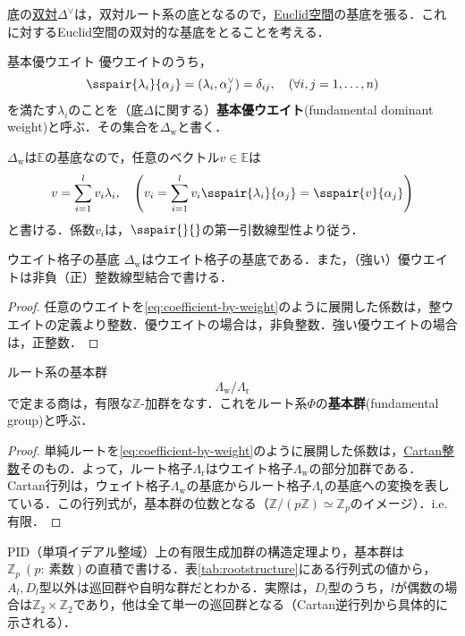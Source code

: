 \documentclass[rep_main]{subfiles}
\begin{document}
底の\hyperref[def:dual-root]{双対}$\Delta^\vee$は，双対ルート系の底となるので，\hyperref[def:Euclid-space]{Euclid空間}の基底を張る．これに対するEuclid空間の双対的な基底をとることを考える．
\begin{mydef}[label=def:fundamental-weight]{基本優ウエイト}
	優ウエイトのうち，
	\begin{equation}
		\sspair{\lambda_i}{\alpha_j} = (\lambda_i, \alpha_j^\vee) = \delta_{ij},\quad  (\forall i, j = 1, \ldots, n)
	\end{equation}
	を満たす$\lambda_i$のことを（底$\Delta$に関する）\textbf{基本優ウエイト}(fundamental dominant weight)と呼ぶ．その集合を$\Delta_\text{w}$と書く．
\end{mydef}
$\Delta_\text{w}$は$\mathbb{E}$の基底なので，任意のベクトル$v \in \mathbb{E}$は
\begin{equation}
	\label{eq:coefficient-by-weight}
	v = \sum_{i=1}^l v_i\lambda_i,\quad  \Biggl(v_i = \sum_{i=1}^l v_i\sspair{\lambda_i}{\alpha_j} = \sspair{v}{\alpha_j}\Biggr)
\end{equation}
と書ける．係数$v_i$は，$\sspair{}{}$の第一引数線型性より従う．
\begin{mytheo}[label=thm:weightlatticebasis]{ウエイト格子の基底}
	$\Delta_\text{w}$はウエイト格子の基底である．また，（強い）優ウエイトは非負（正）整数線型結合で書ける．
\end{mytheo}
\begin{proof}
	任意のウエイトを\eqref{eq:coefficient-by-weight}のように展開した係数は，整ウエイトの定義より整数．優ウエイトの場合は，非負整数．強い優ウエイトの場合は，正整数．
\end{proof}
\begin{mydef}[label=def:root-fundamental-group]{ルート系の基本群}
	\begin{equation}
		\Lambda_\text{w} / \Lambda_\text{r}
	\end{equation}
	で定まる商は，有限な$\mathbb{Z}$-加群をなす．これをルート系$\Phi$の\textbf{基本群}(fundamental group)と呼ぶ．
\end{mydef}
\begin{proof}
	単純ルートを\eqref{eq:coefficient-by-weight}のように展開した係数は，\hyperref[def:Cartan-matrix]{Cartan整数}そのもの．よって，ルート格子$\Lambda_\text{r}$はウエイト格子$\Lambda_\text{w}$の部分加群である．\\
	Cartan行列は，ウェイト格子$\Lambda_\text{w}$の基底からルート格子$\Lambda_\text{r}$の基底への変換を表している．この行列式が，基本群の位数となる（$\mathbb{Z}/(p\mathbb{Z}) \simeq \mathbb{Z}_p$のイメージ）．i.e. 有限．
\end{proof}
PID（単項イデアル整域）上の有限生成加群の構造定理より，基本群は$\mathbb{Z}_p\ (p:\ \text{素数})$の直積で書ける．表\ref{tab:rootstructure}にある行列式の値から，$A_l, D_l$型以外は巡回群や自明な群だとわかる．実際は，$D_l$型のうち，$l$が偶数の場合は$\mathbb{Z}_2\times\mathbb{Z}_2$であり，他は全て単一の巡回群となる（Cartan逆行列から具体的に示される）．
\end{document}

